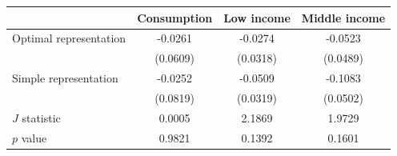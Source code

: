 \begin{threeparttable}
\begin{tabular}{l | ccc}
\toprule
 & \multicolumn{1}{c}{Consumption} & \multicolumn{1}{c}{Low income} & \multicolumn{1}{c}{Middle income} \\
\midrule
  Optimal representation & -0.0261 & -0.0274 & -0.0523 \\
           & (0.0609) & (0.0318) & (0.0489) \\
\addlinespace[0.3em]
  Simple representation & -0.0252 & -0.0509 & -0.1083 \\
           & (0.0819) & (0.0319) & (0.0502) \\
\midrule
  $J$ statistic & 0.0005 & 2.1869 & 1.9729 \\
  $p$ value     & 0.9821 & 0.1392 & 0.1601 \\
\bottomrule
\end{tabular}
\end{threeparttable}

